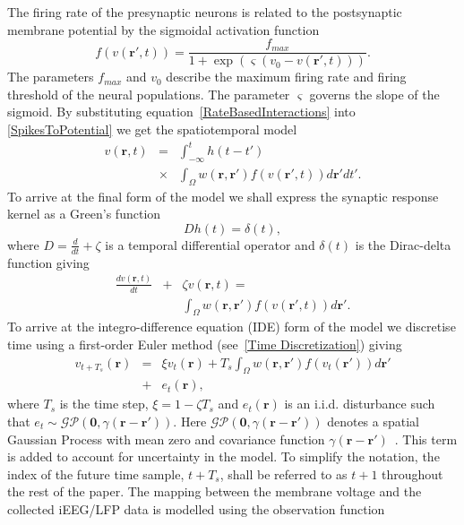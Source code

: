 \documentclass[twocolumn,11pt,a4paper]{article}		%
\begin{document}
The firing rate of the presynaptic neurons is related to the postsynaptic membrane potential by the sigmoidal activation function 
\begin{equation}
	\label{ActivationFunction} f\left( v\left( \mathbf{r}', t \right) \right) = \frac{f_{max}}{1 + \exp \left( \varsigma \left( v_0 - v\left(\mathbf{r}',t\right) \right) \right)}. 
\end{equation}
The parameters $f_{max}$ and $v_0$ describe the maximum firing rate and firing threshold of the neural populations. The parameter $\varsigma$ governs the slope of the sigmoid. By substituting equation~\ref{RateBasedInteractions} into \ref{SpikesToPotential} we get the spatiotemporal model 
\begin{eqnarray}
	\label{FullDoubleIntModel} v\left(\mathbf{r},t\right) &=&  \int_{-\infty}^t h\left(t - t'\right) \\
	&\times&\int_\Omega w\left(\mathbf{r},\mathbf{r}'\right) f\left( v\left( \mathbf{r}',t \right)\right)d\mathbf{r}'dt'. \nonumber
\end{eqnarray}
To arrive at the final form of the model we shall express the synaptic response kernel as a Green's function 
\begin{equation}
	\label{GreensFuncDef} Dh\left( t \right) = \delta \left( t \right), 
\end{equation}
where $D=\frac{d}{dt} + \zeta$ is a temporal differential operator and $\delta(t)$ is the Dirac-delta function giving 
\begin{eqnarray}
	\label{FinalFormContinuous} \frac{dv\left( \mathbf{r},t \right)}{dt} &+& \zeta v\left( \mathbf{r},t \right) = \\
	&&\int_\Omega {w\left( \mathbf{r},\mathbf{r}' \right)f\left( {v\left( \mathbf{r}',t \right)} \right)d\mathbf{r}'}. \nonumber
\end{eqnarray}
To arrive at the integro-difference equation (IDE) form of the model we discretise time using a first-order Euler method (see~\ref{Time Discretization}) giving 
\begin{eqnarray}
	\label{DiscreteTimeModel} v_{t+T_s}\left(\mathbf{r}\right) &=& \xi v_t\left(\mathbf{r}\right) + T_s \int_\Omega { w\left(\mathbf{r},\mathbf{r}'\right) f\left(v_t\left(\mathbf{r}'\right)\right) d\mathbf{r}'} \nonumber\\ 
	&+& e_t\left(\mathbf{r}\right), 
\end{eqnarray}
where $T_s$ is the time step, $\xi = 1-\zeta T_s$ and $e_t(\mathbf{r})$ is an i.i.d. disturbance such that $e_t\sim\mathcal{GP}(\mathbf 0,\gamma(\mathbf{r}-\mathbf{r}'))$. Here $\mathcal{GP}(\mathbf 0,\gamma(\mathbf{r}-\mathbf{r}'))$ denotes a spatial Gaussian Process with mean zero and covariance function $\gamma(\mathbf{r}-\mathbf{r}')$~\cite{Rasmussen2005}. This term is added to account for uncertainty in the model. To simplify the notation, the index of the future time sample, $t+T_s$, shall be referred to as $t+1$ throughout the rest of the paper. The mapping between the membrane voltage and the collected iEEG/LFP data is modelled using the observation function 
\end{document}
